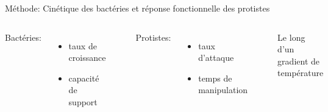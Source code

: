 \documentclass[11pt, compress, aspectratio=1610]{beamer}
\providecommand{\tightlist}{%
  \setlength{\itemsep}{0pt}\setlength{\parskip}{0pt}}
\newcommand{\begincols}{\begin{columns}}
\newcommand{\stopcols}{\end{columns}}
\begin{document}
\begin{frame}{Méthode: Cinétique des bactéries et réponse fonctionnelle
des protistes}

\begincols
  \centering
 \par

\hfill{}

Bactéries:

\begin{itemize}
\tightlist
\item
  taux de croissance
\item
  capacité de support
\end{itemize}

~

Protistes:

\begin{itemize}
\tightlist
\item
  taux d'attaque
\item
  temps de manipulation
\end{itemize}

~

Le long d'un gradient de température \stopcols

\end{frame}
\end{document}
